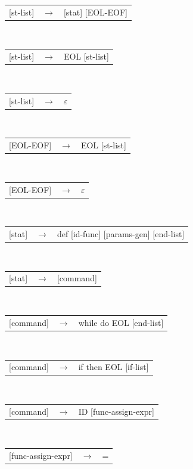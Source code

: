 \documentclass[11pt, a4paper]{article}
\begin{document}
\newpage
\begin{algorithm}[H]
  \SetInd{0em}{1em}
  \SetNlSty{}{}{:}
  \SetNlSkip{-1em}
  \Indp
  \Indp
  \BlankLine
  \begin{tabularx}{\textwidth}{l>{$}c<{$}X}
 {[st-list]} &\rightarrow& [stat] [EOL-EOF]
\end{tabularx}\\
  \begin{tabularx}{\textwidth}{l>{$}c<{$}X}
  {[st-list]} &\rightarrow& EOL [st-list]
\end{tabularx}\\
  \begin{tabularx}{\textwidth}{l>{$}c<{$}X}
  {[st-list]} &\rightarrow& $\varepsilon$
\end{tabularx}\\ 
  \begin{tabularx}{\textwidth}{l>{$}c<{$}X}
  {[EOL-EOF]} &\rightarrow& EOL [st-list]
\end{tabularx}\\ 
  \begin{tabularx}{\textwidth}{l>{$}c<{$}X}
  {[EOL-EOF]} &\rightarrow& $\varepsilon$
\end{tabularx}\\ 
  \begin{tabularx}{\textwidth}{l>{$}c<{$}X}
  {[stat]}    &\rightarrow& def [id-func] [params-gen] [end-list]
\end{tabularx}\\ 
  \begin{tabularx}{\textwidth}{l>{$}c<{$}X}
  {[stat]}    &\rightarrow& [command]
\end{tabularx}\\ 
  \begin{tabularx}{\textwidth}{l>{$}c<{$}X}
  {[command]} &\rightarrow& while do EOL [end-list]
\end{tabularx}\\ 
  \begin{tabularx}{\textwidth}{l>{$}c<{$}X}
  {[command]} &\rightarrow& if then EOL [if-list]
\end{tabularx}\\ 
  \begin{tabularx}{\textwidth}{l>{$}c<{$}X}
  {[command]} &\rightarrow& ID [func-assign-expr]
\end{tabularx}\\ 
  \begin{tabularx}{\textwidth}{l>{$}c<{$}X}
  {[func-assign-expr]} &\rightarrow& = 
\end{tabularx}\\ 

\end{algorithm}
\end{document}
